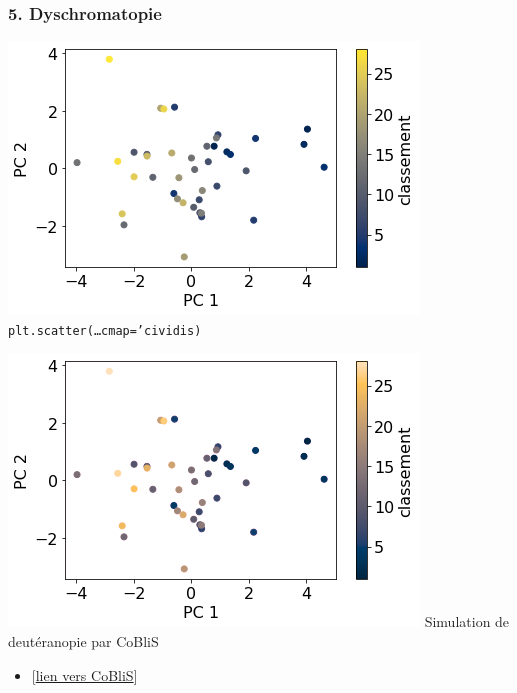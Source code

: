 \documentclass[sans,14pt]{beamer}
\begin{document}
{\begin{frame}
  \frametitle{5. Dyschromatopie}
  \begin{minipage}[h]{0.49\linewidth}
    \begin{center}
      \includegraphics[width=\textwidth]{figures/pca_plot_cividis} \newline
      {\footnotesize{\texttt{plt.scatter(\dots cmap='cividis)}}}
    \end{center}
  \end{minipage}%
  \pause
  \hfill
  \begin{minipage}[h]{0.49\linewidth}
    \begin{center}
      \includegraphics[width=\textwidth]{figures/pca_plot_cividis_coblis} \newline
      {\footnotesize{Simulation de deutéranopie par CoBliS}}
      \end{center}
    \end{minipage}%
    \vspace{2em}
    \begin{itemize}
    \item[] \footnotesize \hfill [\href{https://www.color-blindness.com/coblis-color-blindness-simulator/}{lien vers CoBliS}]
    \end{itemize}
\end{frame}


}
\end{document}
